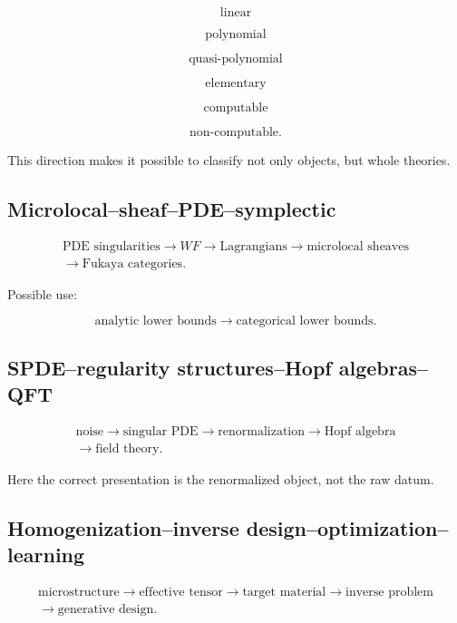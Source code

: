 \documentclass[11pt]{article}
\begin{document}
\[
\text{linear}
\]

\[
\text{polynomial}
\]

\[
\text{quasi-polynomial}
\]

\[
\text{elementary}
\]

\[
\text{computable}
\]

\[
\text{non-computable}.
\]

This direction makes it possible to classify not only objects, but whole theories.



\subsection{Microlocal--sheaf--PDE--symplectic}

\[
\begin{gathered}
\text{PDE singularities} \to WF \to \text{Lagrangians} \to \text{microlocal sheaves} \\
\to \text{Fukaya categories}.
\end{gathered}
\]

Possible use:

\[
\text{analytic lower bounds}
\to
\text{categorical lower bounds}.
\]



\subsection{SPDE--regularity structures--Hopf algebras--QFT}

\[
\begin{gathered}
\text{noise} \to \text{singular PDE} \to \text{renormalization} \to \text{Hopf algebra} \\
\to \text{field theory}.
\end{gathered}
\]

Here the correct presentation is the renormalized object, not the raw datum.



\subsection{Homogenization--inverse design--optimization--learning}

\[
\begin{gathered}
\text{microstructure} \to \text{effective tensor} \to \text{target material} \to \text{inverse problem} \\
\to \text{generative design}.
\end{gathered}
\]
\end{document}
